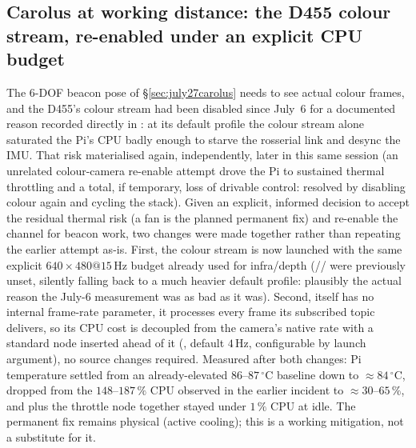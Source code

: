 \subsection{Carolus at working distance: the D455 colour stream, re-enabled
under an explicit CPU budget}
\label{sec:july27color}
The 6-DOF beacon pose of \S\ref{sec:july27carolus} needs 
to see actual colour frames, and the D455's colour stream had been disabled
since July~6 for a documented reason recorded directly in
: at its default profile the colour stream alone
saturated the Pi's CPU badly enough to starve the rosserial link and desync
the IMU. That risk materialised again, independently, later in this same
session (an unrelated colour-camera re-enable attempt drove the Pi to
sustained thermal throttling and a total, if temporary, loss of drivable
control: resolved by disabling colour again and cycling the stack). Given
an explicit, informed decision to accept the residual thermal risk (a fan is
the planned permanent fix) and re-enable the channel for beacon work, two
changes were made together rather than repeating the earlier attempt as-is.
First, the colour stream is now launched with the same explicit
$640{\times}480@15\,$Hz budget already used for infra/depth
(// were previously
unset, silently falling back to a much heavier default profile:
plausibly the actual reason the July-6 measurement was as bad as it was).
Second,  itself has no internal frame-rate
parameter, it processes every frame its subscribed topic delivers, so
its CPU cost is decoupled from the camera's native rate with a standard
 node inserted ahead of it
(, default $4\,$Hz, configurable by launch
argument), no source changes required. Measured after both changes: Pi
temperature settled from an already-elevated $86\text{--}87\,^{\circ}\mathrm{C}$
baseline down to $\approx 84\,^{\circ}\mathrm{C}$, 
dropped from the $148\text{--}187\,\%$ CPU observed in the earlier incident
to $\approx 30\text{--}65\,\%$, and  plus the
throttle node together stayed under $1\,\%$ CPU at idle. The permanent fix
remains physical (active cooling); this is a working mitigation, not a
substitute for it.

